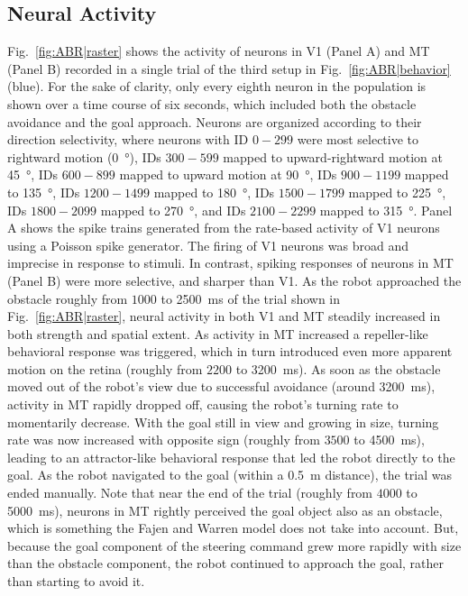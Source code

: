 \subsection{Neural Activity}
Fig.~\ref{fig:ABR|raster} shows the activity of neurons in \ac{V1}
(Panel A) and \ac{MT} (Panel B) recorded in a single trial 
of the third setup in Fig.~\ref{fig:ABR|behavior} (blue).
For the sake of clarity, only every eighth neuron in the population is
shown over a time course of six seconds, which included both the
obstacle avoidance and the goal approach. Neurons are organized
according to their direction selectivity, where neurons with ID
$0-299$ were most selective to rightward motion (\SI{0}{\degree}), 
IDs $300-599$ mapped to upward-rightward motion at \SI{45}{\degree}, 
IDs $600-899$ mapped to upward motion at \SI{90}{\degree}, 
IDs $900-1199$ mapped to \SI{135}{\degree}, IDs $1200-1499$
mapped to \SI{180}{\degree}, IDs $1500-1799$ mapped to \SI{225}{\degree},
IDs $1800-2099$ mapped to \SI{270}{\degree}, and IDs $2100-2299$
mapped to \SI{315}{\degree}.
Panel A shows the spike trains generated from the rate-based
activity of \ac{V1} neurons using a Poisson spike generator. The firing
of \ac{V1} neurons was broad and imprecise in response to stimuli. In
contrast, spiking responses of neurons in \ac{MT} (Panel B) were more
selective, and sharper than \ac{V1}.
As the robot approached the obstacle roughly from $1000$ to
\SI{2500}{\milli\second} of the trial shown in Fig.~\ref{fig:ABR|raster},
neural activity in both \ac{V1} and \ac{MT} steadily increased in 
both strength and spatial extent. As
activity in \ac{MT} increased a repeller-like behavioral response was
triggered, which in turn introduced even more apparent motion on
the retina (roughly from $2200$ to \SI{3200}{\milli\second}). 
As soon as the obstacle moved out of the robot's view due to 
successful avoidance (around \SI{3200}{\milli\second}), 
activity in \ac{MT} rapidly dropped off, causing the robot's
turning rate to momentarily decrease. With the goal still in view
and growing in size, turning rate was now increased with opposite
sign (roughly from $3500$ to \SI{4500}{\milli\second}), 
leading to an attractor-like behavioral response that led the robot 
directly to the goal. As the
robot navigated to the goal (within a \SI{0.5}{\meter} distance), 
the trial was ended manually. 
Note that near the end of the trial (roughly from
$4000$ to \SI{5000}{\milli\second}), neurons in \ac{MT} rightly perceived
the goal object also as an obstacle, which is something the 
Fajen and Warren model does not take into account.
But, because the goal component
of the steering command grew more rapidly with size than the
obstacle component, the robot continued to approach the goal,
rather than starting to avoid it.

